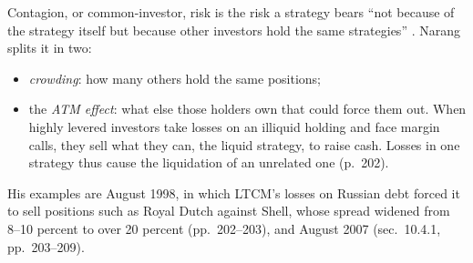 \begin{qfdefinition}\label{def:common-investor-contagion}
 Contagion, or common-investor, risk is the risk a strategy bears ``not because of the strategy itself but because other investors hold the same strategies'' \citep[chap.~``Risks Inherent to Quant Strategies'', sec.~10.4, p.~202]{s7-narang}. Narang splits it in two:
\begin{itemize}
\item \emph{crowding}: how many others hold the same positions;
\item the \emph{ATM effect}: what else those holders own that could force them out. When highly levered investors take losses on an illiquid holding and face margin calls, they sell what they can, the liquid strategy, to raise cash. Losses in one strategy thus cause the liquidation of an unrelated one (p.~202).
\end{itemize}
His examples are August 1998, in which LTCM's losses on Russian debt forced it to sell positions such as Royal Dutch against Shell, whose spread widened from 8--10 percent to over 20 percent (pp.~202--203), and August 2007 (sec.~10.4.1, pp.~203--209).


\end{qfdefinition}

